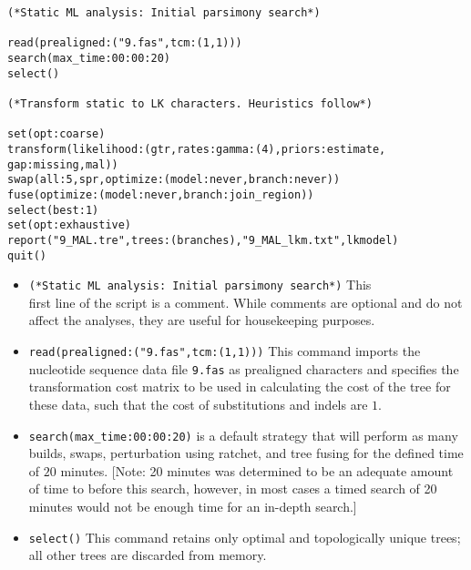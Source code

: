 \begin{verbatim}
(*Static ML analysis: Initial parsimony search*)

read(prealigned:("9.fas",tcm:(1,1)))
search(max_time:00:00:20)
select()

(*Transform static to LK characters. Heuristics follow*)

set(opt:coarse)
transform(likelihood:(gtr,rates:gamma:(4),priors:estimate, 
gap:missing,mal))
swap(all:5,spr,optimize:(model:never,branch:never))
fuse(optimize:(model:never,branch:join_region))
select(best:1)
set(opt:exhaustive)
report("9_MAL.tre",trees:(branches),"9_MAL_lkm.txt",lkmodel)
quit()
\end{verbatim}

\begin{itemize}
\item \texttt{(*Static ML analysis: Initial parsimony search*)}
This \\ first line of the script is a comment. While comments are
optional and do not affect the analyses, they are useful for
housekeeping purposes.  
\item \texttt{read(prealigned:("9.fas",tcm:(1,1)))}
This command imports the nucleotide sequence data file \texttt{9.fas}
as prealigned characters and specifies the transformation cost
matrix to be used in calculating the cost of the tree for these
data, such that the cost of substitutions and indels are $1$.  
\item \texttt{search(max\_time:00:00:20)}  is a default
strategy that will perform as many builds, swaps,  perturbation
using ratchet, and tree fusing for the defined time of $ 20 $
minutes. [Note: 20 minutes was determined to be an adequate amount
of time to before this search, however, in most cases a timed search
of 20 minutes would not be enough time for an in-depth search.]
\item \texttt{select()} This command retains only optimal and
topologically unique trees; all other trees are discarded from
memory.  


\end{itemize}
